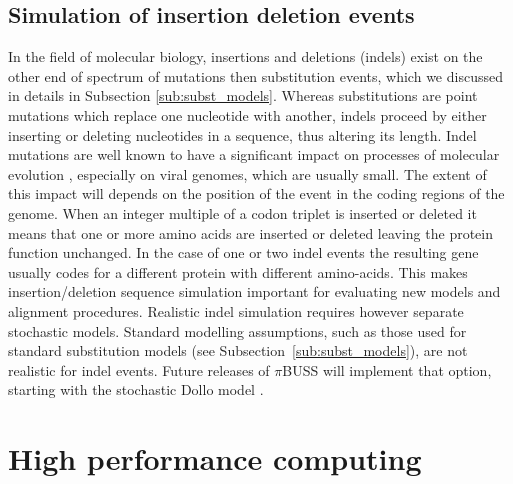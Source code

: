 \subsection{Simulation of insertion deletion events}

In the field of molecular biology, insertions and deletions (indels) exist on the other end of spectrum of mutations then substitution events, which we discussed in details in Subsection \ref{sub:subst_models}.
Whereas substitutions are point mutations which replace one nucleotide with another, indels proceed by either inserting or deleting nucleotides in a sequence, thus altering its length. 
Indel mutations are well known to have a significant impact on processes of molecular evolution \citep{Fletcher2009}, especially on viral genomes, which are usually small.
The extent of this impact will depends on the position of the event in the coding regions of the genome.
When an integer multiple of a codon triplet is inserted or deleted it means that one or more amino acids are inserted or deleted leaving the protein function unchanged.
In the case of one or two indel events the resulting gene usually codes for a different protein with different amino-acids.
This makes insertion/deletion sequence simulation important for evaluating new models and alignment procedures.
Realistic indel simulation requires however separate stochastic models.
Standard modelling assumptions, such as those used for standard substitution models (see Subsection~\ref{sub:subst_models}), are not realistic for indel events.
Future releases of $\pi$BUSS will implement that option, starting with the stochastic Dollo model \citep{LeQuesne1974}.

\section{High performance computing}

